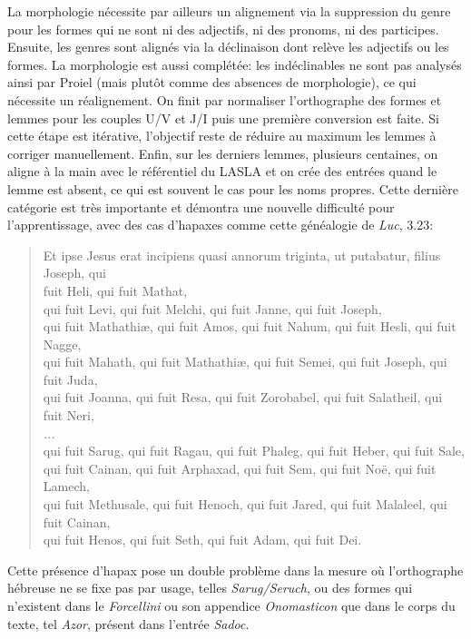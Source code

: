 La morphologie nécessite par ailleurs un alignement via la suppression du genre pour les formes qui ne sont ni des adjectifs, ni des pronoms, ni des participes. Ensuite, les genres sont alignés via la déclinaison dont relève les adjectifs ou les formes. La morphologie est aussi complétée: les indéclinables ne sont pas analysés ainsi par Proiel (mais plutôt comme des absences de morphologie), ce qui nécessite un réalignement. On finit par normaliser l'orthographe des formes et lemmes pour les couples U/V et J/I puis une première conversion est faite. Si cette étape est itérative, l'objectif reste de réduire au maximum les lemmes à corriger manuellement. Enfin, sur les derniers lemmes, plusieurs centaines, on aligne à la main avec le référentiel du LASLA et on crée des entrées quand le lemme est absent, ce qui est souvent le cas pour les noms propres. Cette dernière catégorie est très importante et démontra une nouvelle difficulté pour l'apprentissage, avec des cas d'hapaxes comme cette généalogie de \textit{Luc}, 3.23:

\blockquote{Et ipse Jesus erat incipiens quasi annorum triginta, ut putabatur, filius Joseph, qui  \\fuit Heli, qui fuit Mathat, \\
qui fuit Levi, qui fuit Melchi, qui fuit Janne, qui fuit Joseph, \\
qui fuit Mathathiæ, qui fuit Amos, qui fuit Nahum, qui fuit Hesli, qui fuit Nagge, \\
qui fuit Mahath, qui fuit Mathathiæ, qui fuit Semei, qui fuit Joseph, qui fuit Juda, \\
qui fuit Joanna, qui fuit Resa, qui fuit Zorobabel, qui fuit Salatheil, qui fuit Neri, \\
\textit{...} \\
qui fuit Sarug, qui fuit Ragau, qui fuit Phaleg, qui fuit Heber, qui fuit Sale, \\
qui fuit Cainan, qui fuit Arphaxad, qui fuit Sem, qui fuit Noë, qui fuit Lamech, \\
qui fuit Methusale, qui fuit Henoch, qui fuit Jared, qui fuit Malaleel, qui fuit Cainan, \\
qui fuit Henos, qui fuit Seth, qui fuit Adam, qui fuit Dei.}

Cette présence d'hapax pose un double problème dans la mesure où l'orthographe hébreuse ne se fixe pas par usage, telles \textit{Sarug/Seruch}, ou des formes qui n'existent dans le \textit{Forcellini} ou son appendice \textit{Onomasticon} que dans le corps du texte, tel \textit{Azor}, présent dans l'entrée \textit{Sadoc}.

